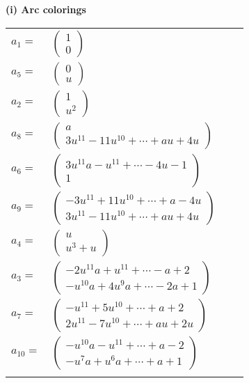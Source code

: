 \documentclass[1p]{elsarticle_modified}
\theoremstyle{definition}
\begin{document}
\flushleft \textbf{(i) Arc colorings}\\
\begin{tabular}{m{7pt} m{180pt} m{7pt} m{180pt} }
\flushright $a_{1}=$&$\begin{pmatrix}1\\0\end{pmatrix}$ \\
\flushright $a_{5}=$&$\begin{pmatrix}0\\u\end{pmatrix}$ \\
\flushright $a_{2}=$&$\begin{pmatrix}1\\u^2\end{pmatrix}$ \\
\flushright $a_{8}=$&$\begin{pmatrix}a\\3 u^{11}-11 u^{10}+\cdots+a u+4 u\end{pmatrix}$ \\
\flushright $a_{6}=$&$\begin{pmatrix}3 u^{11} a- u^{11}+\cdots-4 u-1\\1\end{pmatrix}$ \\
\flushright $a_{9}=$&$\begin{pmatrix}-3 u^{11}+11 u^{10}+\cdots+a-4 u\\3 u^{11}-11 u^{10}+\cdots+a u+4 u\end{pmatrix}$ \\
\flushright $a_{4}=$&$\begin{pmatrix}u\\u^3+u\end{pmatrix}$ \\
\flushright $a_{3}=$&$\begin{pmatrix}-2 u^{11} a+u^{11}+\cdots- a+2\\- u^{10} a+4 u^9 a+\cdots-2 a+1\end{pmatrix}$ \\
\flushright $a_{7}=$&$\begin{pmatrix}- u^{11}+5 u^{10}+\cdots+a+2\\2 u^{11}-7 u^{10}+\cdots+a u+2 u\end{pmatrix}$ \\
\flushright $a_{10}=$&$\begin{pmatrix}- u^{10} a- u^{11}+\cdots+a-2\\- u^7 a+u^6 a+\cdots+a+1\end{pmatrix}$\\&\end{tabular}
\end{document}
